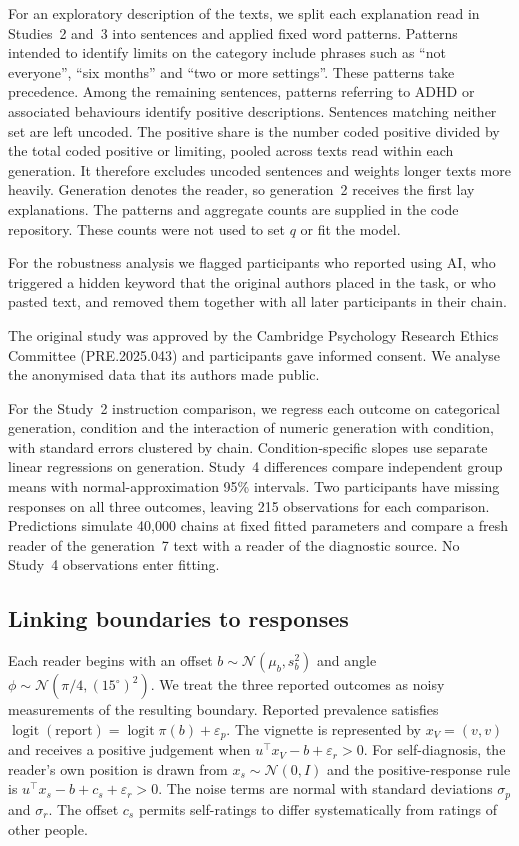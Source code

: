 \documentclass[11pt]{article}
\begin{document}
For an exploratory description of the texts, we split each explanation read in Studies~2 and~3 into sentences and applied fixed word patterns. Patterns intended to identify limits on the category include phrases such as ``not everyone'', ``six months'' and ``two or more settings''. These patterns take precedence. Among the remaining sentences, patterns referring to ADHD or associated behaviours identify positive descriptions. Sentences matching neither set are left uncoded. The positive share is the number coded positive divided by the total coded positive or limiting, pooled across texts read within each generation. It therefore excludes uncoded sentences and weights longer texts more heavily. Generation denotes the reader, so generation~2 receives the first lay explanations. The patterns and aggregate counts are supplied in the code repository. These counts were not used to set $q$ or fit the model.

For the robustness analysis we flagged participants who reported using AI, who triggered a hidden keyword that the original authors placed in the task, or who pasted text, and removed them together with all later participants in their chain.

The original study was approved by the Cambridge Psychology Research Ethics Committee (PRE.2025.043) and participants gave informed consent. We analyse the anonymised data that its authors made public.

For the Study~2 instruction comparison, we regress each outcome on categorical generation, condition and the interaction of numeric generation with condition, with standard errors clustered by chain. Condition-specific slopes use separate linear regressions on generation. Study~4 differences compare independent group means with normal-approximation 95\% intervals. Two participants have missing responses on all three outcomes, leaving 215 observations for each comparison. Predictions simulate 40{,}000 chains at fixed fitted parameters and compare a fresh reader of the generation~7 text with a reader of the diagnostic source. No Study~4 observations enter fitting.

\subsection{Linking boundaries to responses}

Each reader begins with an offset $b\sim\mathcal{N}(\mu_b,s_b^2)$ and angle $\phi\sim\mathcal{N}(\pi/4,(15^\circ)^2)$. We treat the three reported outcomes as noisy measurements of the resulting boundary. Reported prevalence satisfies $\operatorname{logit}(\text{report})=\operatorname{logit}\pi(b)+\varepsilon_p$. The vignette is represented by $x_V=(v,v)$ and receives a positive judgement when $u^\top x_V-b+\varepsilon_r>0$. For self-diagnosis, the reader's own position is drawn from $x_s\sim\mathcal{N}(0,I)$ and the positive-response rule is $u^\top x_s-b+c_s+\varepsilon_r>0$. The noise terms are normal with standard deviations $\sigma_p$ and $\sigma_r$. The offset $c_s$ permits self-ratings to differ systematically from ratings of other people.
\end{document}
